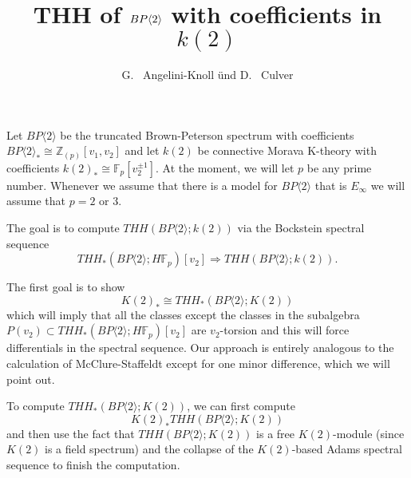 \documentclass[12pt]{amsart}
\title{THH of $\tBP{2}$ with coefficients in $k(2)$}
\author{ G.~ Angelini-Knoll \"und D.~ Culver}\address{University of Illinois, Urbana-Champaign}\email{dculver@nd.edu}\address{Michigan State University, East Lansing}\email{angelini@math.msu.edu}
\newcommand{\bra}[1]{\langle #1 \rangle}
\newcommand{\Z}{\mathbb{Z}}
\newcommand{\F}{\mathbb{F}}
\newcommand{\tBP}[1]{BP\bra{#1}}
\theoremstyle{definition}
\numberwithin{equation}{section}
\numberwithin{figure}{section}
\begin{document}
\maketitle

Let $\tBP{2}$ be the truncated Brown-Peterson spectrum with coefficients $\tBP{2}_*\cong \Z_{(p)}[v_1,v_2]$ and let $k(2)$ be connective Morava K-theory with coefficients $k(2)_*\cong \F_p[v_2^{\pm1}]$. At the moment, we will let $p$ be any prime number. Whenever we assume that there is a model for $\tBP{2}$ that is $E_{\infty}$ we will assume that $p=2$ or $3$. 

The goal is to compute $THH(\tBP{2};k(2))$ via the Bockstein spectral sequence 
\[ THH_*(\tBP{2};H\F_p)[v_2]\Rightarrow THH(\tBP{2};k(2)).\]

The first goal is to show
\begin{equation}\label{K(2) coeff} K(2)_*\cong THH_*(\tBP{2};K(2)) \end{equation}
which will imply that all the classes except the classes in the subalgebra $P(v_2)\subset THH_*(\tBP{2};H\F_p)[v_2]$ are $v_2$-torsion and this will force differentials in the spectral sequence. Our approach is entirely analogous to the calculation of McClure-Staffeldt except for one minor difference, which we will point out. 

To compute $THH_*(\tBP{2};K(2))$, we can first compute 
\[ K(2)_*THH(\tBP{2};K(2)) \]
and then use the fact that $THH(\tBP{2};K(2))$ is a free $K(2)$-module (since $K(2)$ is a field spectrum) and the collapse of the $K(2)$-based Adams spectral sequence to finish the computation. 
\end{document}
